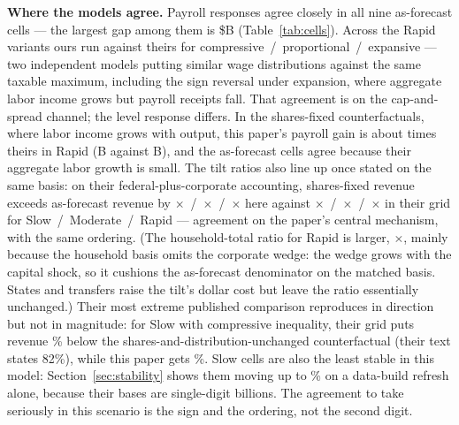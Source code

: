 \textbf{Where the models agree.} Payroll responses agree closely in all nine
as-forecast cells --- the largest gap among them is
\$\genPayrollMaxCellGap B (Table~\ref{tab:cells}). Across the Rapid variants
ours run \genPayrollTripletOurs{} against theirs
\genPayrollTripletTheirs{} for compressive~/~proportional~/~expansive ---
two independent models putting similar wage distributions against the same
taxable maximum, including the sign reversal under expansion, where
aggregate labor income grows but payroll receipts fall. That agreement is on
the cap-and-spread channel; the level response differs. In the shares-fixed
counterfactuals, where labor income grows with output, this paper's payroll
gain is about \genPayrollFixedRapidRatio{} times theirs in Rapid
(\genPayrollFixedRapidOurs B against \genPayrollFixedRapidTheirs B), and the
as-forecast cells agree because their aggregate labor growth is small. The tilt
ratios also line up once stated on the same basis: on their
federal-plus-corporate accounting, shares-fixed revenue exceeds as-forecast
revenue by
\genTiltOursMatchedSlow$\times$~/~\genTiltOursMatchedMod$\times$~/~\genTiltOursMatchedRapid$\times$
here against
\genTiltTheirsSlow$\times$~/~\genTiltTheirsMod$\times$~/~\genTiltTheirsRapid$\times$
in their grid for Slow~/~Moderate~/~Rapid --- agreement on the paper's
central mechanism, with the same ordering. (The household-total ratio for
Rapid is larger, \genTiltOursHouseholdRapid$\times$, mainly because the
household basis omits the corporate wedge: the wedge grows with the capital
shock, so it cushions the as-forecast denominator on the matched basis.
States and transfers raise the tilt's dollar cost but leave the ratio
essentially unchanged.) Their most extreme published comparison
reproduces in direction but not in magnitude: for Slow with compressive
inequality, their grid puts revenue \genSlowCompTheirsLowerPct\% below the
shares-and-distribution-unchanged counterfactual (their text states 82\%),
while this paper gets \genSlowCompOursLowerPct\%. Slow cells are
also the least stable in this model: Section~\ref{sec:stability} shows them
moving up to \genStabMaxRelPct\% on a data-build refresh alone, because
their bases are single-digit billions. The agreement to take seriously in
this scenario is the sign and the ordering, not the second digit.

\begin{table}[t]
\centering
\small
\tabPayrollCells
\caption{Cell-level comparison on the matched federal basis, all nine
as-forecast cells, \$B, 2030.}
\label{tab:cells}
\end{table}

